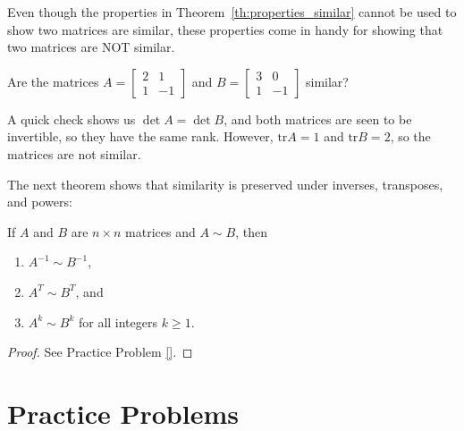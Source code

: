 \documentclass{ximera}
\begin{document}
Even though the properties in Theorem~\ref{th:properties_similar} cannot be used to show two matrices are similar, these properties come in handy for showing that two matrices are NOT similar.

\begin{example}
Are the matrices $A =
\begin{bmatrix}
2 & 1 \\
1 & -1
\end{bmatrix}$ and $B =
\begin{bmatrix}
3 & 0 \\
1 & -1
\end{bmatrix}$ similar?
\begin{explanation}
A quick check shows us $\det A = \det B$, and both matrices are seen to be invertible, so they have the same rank.  However, $\mbox{tr} A = 1$ and $\mbox{tr} B = 2$, so the matrices are not similar.
\end{explanation}
\end{example}

The next theorem shows that similarity is preserved under inverses, transposes, and powers:

\begin{theorem}\label{th:other_properties_similar}
If $A$ and $B$ are $n\times n$ matrices and $A\sim B$, then
\begin{enumerate}
\item\label{th:properties_similar_inverse} $A^{-1} \sim B^{-1}$,
\item\label{th:properties_similar_transpose} $A^T \sim B^T$, and
\item\label{th:properties_similar_powers} $A^k \sim B^k$ for all integers $k \geq 1$.
\end{enumerate}
\end{theorem}

\begin{proof}
See Practice Problem \ref{}.
\end{proof}

\section*{Practice Problems}
\end{document}
